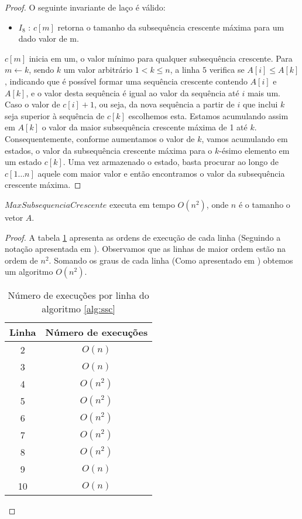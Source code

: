 \begin{proof}

O seguinte invariante de laço é válido:

\begin{itemize}
\item $I_8$ : $c[m]$ retorna o tamanho da subsequência crescente máxima para um dado valor de m.
\end{itemize}

$c[m]$ inicia em um, o valor mínimo para qualquer subsequência crescente. Para $m \leftarrow k$, sendo $k$ um valor arbitrário $ 1 < k \leq n $, a linha $5$ verifica se $A[i] \leq A[k]$, indicando que é possível formar uma sequência crescente contendo $A[i]$ e $A[k]$, e o valor desta sequência é igual ao valor da sequência até $i$ mais um. Caso o valor de $c[i]+1$, ou seja, da nova sequência a partir de $i$ que inclui $k$ seja superior à sequência de $c[k]$ escolhemos esta. Estamos acumulando assim em $A[k]$ o valor da maior subsequência crescente máxima de 1 até $k$. Consequentemente, conforme aumentamos o valor de $k$, vamos acumulando em estados, o valor da subsequência crescente máxima para o $k$-ésimo elemento em um estado $c[k]$. Uma vez armazenado o estado, basta procurar ao longo de $c[1 \ldots n]$ aquele com maior valor e então encontramos o valor da subsequência crescente máxima.

\end{proof}

\begin{teorema}
$MaxSubsequenciaCrescente$ executa em tempo $O(n^2)$, onde $n$ é o tamanho o vetor $A$.
\end{teorema}

\begin{proof}

A tabela \ref{tab:nexecssc} apresenta as ordens de execução de cada linha (Seguindo a notação apresentada em \cite{feofiloffassintotica}). Observamos que as linhas de maior ordem estão na ordem de $n^2$. Somando os graus de cada linha (Como apresentado em \cite{janosiasymptoptic}) obtemos um algoritmo $O(n^2)$.

\begin{table}[h]
\centering
\caption{Número de execuções por linha do algoritmo \ref{alg:ssc}}
\label{tab:nexecssc}
\begin{tabular}{|c|c|}
\hline
Linha & Número de execuções \\ \hline
2 & $O(n)$   \\ \hline
3 & $O(n)$   \\ \hline
4 & $O(n^2)$ \\ \hline
5 & $O(n^2)$ \\ \hline
6 & $O(n^2)$  \\ \hline
7 & $O(n^2)$ \\ \hline
8 & $O(n^2)$ \\ \hline
9 & $O(n)$ \\ \hline
10 & $O(n)$ \\ \hline
\end{tabular}
\end{table}

\end{proof}


